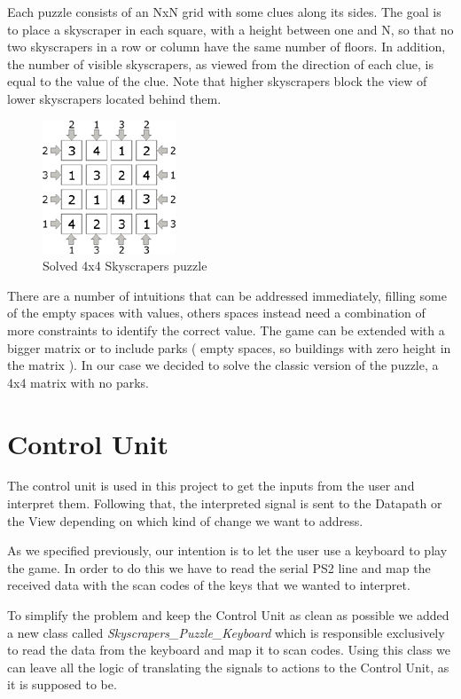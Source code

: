 \documentclass[12pt]{report}
\begin{document}
Each puzzle consists of an NxN grid with some clues along its sides. The
goal is to place a skyscraper in each square, with a height between one
and N, so that no two skyscrapers in a row or column have the same number
of floors. In addition, the number of visible skyscrapers, as viewed from
the direction of each clue, is equal to the value of the clue. Note that
higher skyscrapers block the view of lower skyscrapers located behind
them.

\begin{figure}[H]
  \centering
  \includegraphics[keepaspectratio]{images/skyscrapers_small_solved.jpg}
  \caption{Solved 4x4 Skyscrapers puzzle}
\end{figure}

There are a number of intuitions that can be addressed immediately,
filling some of the empty spaces with values, others spaces instead need
a combination of more constraints to identify the correct value. The game
can be extended with a bigger matrix or to include parks ( empty spaces, so
buildings with zero height in the matrix ). In our case we decided to
solve the classic version of the puzzle, a 4x4 matrix with no parks.

\newpage

\section*{Control Unit}

The control unit is used in this project to get the inputs from the user
and interpret them. Following that, the interpreted signal is sent to
the Datapath or the View depending on which kind of change we want to
address.

As we specified previously, our intention is to let the user use
a keyboard to play the game. In order to do this we have to read the
serial PS2 line and map the received data with the scan codes of the
keys that we wanted to interpret.

To simplify the problem and keep the Control Unit as clean as possible
we added a new class called \textit{Skyscrapers\_Puzzle\_Keyboard} which is
responsible exclusively to read the data from the keyboard and map it to
scan codes. Using this class we can leave all the logic of translating
the signals to actions to the Control Unit, as it is supposed to be.
\end{document}
